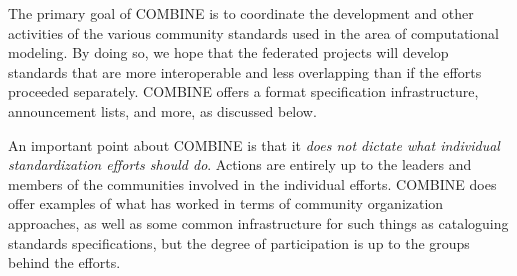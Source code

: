 The primary goal of COMBINE is to coordinate the development and other activities of the various community standards used in the area of computational modeling.  By doing so, we hope that the federated projects will develop standards that are more interoperable and less overlapping than if the efforts proceeded separately.  COMBINE offers a format specification infrastructure, announcement lists, and more, as discussed below.

An important point about COMBINE is that it \emph{does not dictate what individual standardization efforts should do}.  Actions are entirely up to the leaders and members of the communities involved in the individual efforts.   COMBINE does offer examples of what has worked in terms of community organization approaches, as well as some common infrastructure for such things as cataloguing standards specifications, but the degree of participation is up to the groups behind the efforts.
